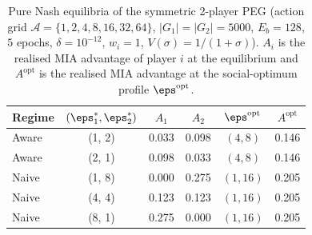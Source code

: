 \begin{table}[t]
\centering
\caption{Pure Nash equilibria of the symmetric 2-player PEG (action grid $\mathcal{A} = \{1, 2, 4, 8, 16, 32, 64\}$, $|G_1|=|G_2|=5000$, $E_b=128$, $5$ epochs, $\delta=10^{-12}$, $w_i = 1$, $V(\sigma) = 1/(1+\sigma)$). $A_i$ is the realised MIA advantage of player $i$ at the equilibrium and $A^{\textrm{opt}}$ is the realised MIA advantage at the social-optimum profile $\boldsymbol{\eps}^{\textrm{opt}}$.}
\label{tab:NE}
\begin{tabular}{lccccc}
\toprule
Regime & $(\eps_1^*, \eps_2^*)$ & $A_1$ & $A_2$ & $\boldsymbol{\eps}^{\textrm{opt}}$ & $A^{\textrm{opt}}$ \\
\midrule
Aware & (1, 2) & 0.033 & 0.098 & $(4, 8)$ & 0.146 \\
Aware & (2, 1) & 0.098 & 0.033 & $(4, 8)$ & 0.146 \\
Naive & (1, 8) & 0.000 & 0.275 & $(1, 16)$ & 0.205 \\
Naive & (4, 4) & 0.123 & 0.123 & $(1, 16)$ & 0.205 \\
Naive & (8, 1) & 0.275 & 0.000 & $(1, 16)$ & 0.205 \\
\bottomrule
\end{tabular}
\end{table}